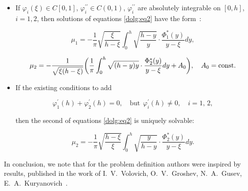 \begin{itemize}

\item[1.] If $\varphi_i(\xi)\in C[0, 1]$, $\varphi_i^{\prime \prime} \in C(0, 1)$, $\varphi_i^{\prime \prime}$ are absolutely integrable on $[0, h]$, ${i=1, 2}$, then solutions of equations \eqref{dolg:eq2}  have the form~\cite{dolg:12}:

$$ \mu_1 = - \frac{1}{\pi} \sqrt{\frac{\xi}{h-\xi}} 

\int _0^h  \sqrt{\frac{h-y}{y}} \cdot \frac{\Phi_1 ^\ast(y) }{y-\xi} dy, 

$$

$$ \mu_2 = - \frac{1}{\sqrt{\xi (h-\xi)}} \biggl(\frac{1}{\pi}  \int  _0^h  \sqrt{(h-y) y} \cdot \frac{\Phi_2^\ast(y) }{y-\xi} dy + A_0\biggr), \quad A_0 = \rm const. $$



\item[2.] If the existing conditions to add

$$ \varphi_1^\prime(h) + \varphi_2^\prime(h)  = 0, \quad \mbox{but} ~ ~ \varphi_i^\prime(h)  \not= 0, \quad i = 1, \, 2,$$

then the second of equations \eqref{dolg:eq2} is uniquely solvable:

$$ \mu_2 = -  \frac{1}{\pi} \sqrt{\frac{h-\xi}{\xi}} \int  _0^h  \sqrt{\frac{y}{h-y}} \cdot \frac{\Phi_2^\ast(y) }{y-\xi} dy. $$





\end{itemize}





In conclusion, we note that for the problem definition authors were inspired by results, published in the work of I.~V.~Volovich, O.~V.~Groshev, N.~A.~Gusev, E.~A.~Kuryanovich~\cite{dolg:13}.











